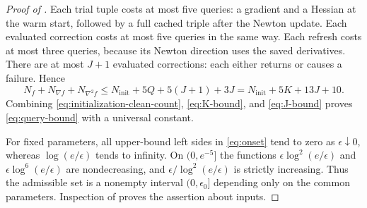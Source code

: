 \documentclass[11pt]{article}
\numberwithin{equation}{section}
\newcommand{\eps}{\epsilon}
\begin{document}
\begin{proof}[Proof of ]
Each trial tuple costs at most five queries: a gradient and a
Hessian at the warm start, followed by a full cached triple after
the Newton update. Each evaluated correction costs at most five
queries in the same way. Each refresh costs at most three queries,
because its Newton direction uses the saved derivatives.
There are at most $J+1$ evaluated corrections: each either returns
or causes a failure. Hence
\begin{equation}\label{eq:explicit-query-count}
 N_f+N_{\nabla f}+N_{\nabla^2f}
 \le N_{\mathrm{init}}+5Q+5(J+1)+3J
 =N_{\mathrm{init}}+5K+13J+10.
\end{equation}
Combining \eqref{eq:initialization-clean-count},
\eqref{eq:K-bound}, and \eqref{eq:J-bound} proves
\eqref{eq:query-bound} with a universal constant.

For fixed parameters, all upper-bound left sides in
\eqref{eq:onset} tend to zero as $\eps\downarrow0$, whereas
$\log(e/\eps)$ tends to infinity. On $(0,e^{-5}]$ the functions
$\eps\log^2(e/\eps)$ and $\eps\log^6(e/\eps)$ are nondecreasing,
and $\eps/\log^2(e/\eps)$ is strictly increasing.
Thus the admissible set is a nonempty interval $(0,\eps_0]$
depending only on the common parameters. Inspection of
 proves the assertion about inputs.
\end{proof}
\end{document}
